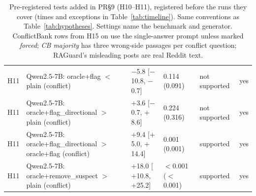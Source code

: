 \begin{table}[p]
{\begin{tabular}{lp{6.6cm}llll}
H11 & Qwen2.5-7B: oracle+flag $<$ plain (conflict) & $-$5.8 [$-$10.8, $-$0.7] & 0.114 (0.091) & not supported & yes \\
H11 & Qwen2.5-7B: oracle+flag\_directional $>$ plain (conflict) & $+$3.6 [$-$0.7, $+$8.6] & 0.224 (0.316) & not supported & yes \\
H11 & Qwen2.5-7B: oracle+flag\_directional $>$ oracle+flag (conflict) & $+$9.4 [$+$5.0, $+$14.4] & 0.001 (0.001) & supported & yes \\
H11 & Qwen2.5-7B: oracle+remove\_suspect $>$ plain (conflict) & $+$18.0 [$+$10.8, $+$25.2] & $<$0.001 ($<$0.001) & supported & yes \\
\bottomrule
\end{tabular}}
\caption{Pre-registered tests added in PR\S9 (H10--H11), registered before the runs they cover (times and exceptions in
Table~\ref{tab:timeline}). Same conventions as
Table~\ref{tab:hypotheses}. Settings name the benchmark and generator. ConflictBank rows from H15 on use the
single-answer prompt unless marked \emph{forced}; \emph{CB majority} has three wrong-side passages per conflict
question; RAGuard's misleading posts are real Reddit text.}
\label{tab:hypotheses2}
\end{table}

